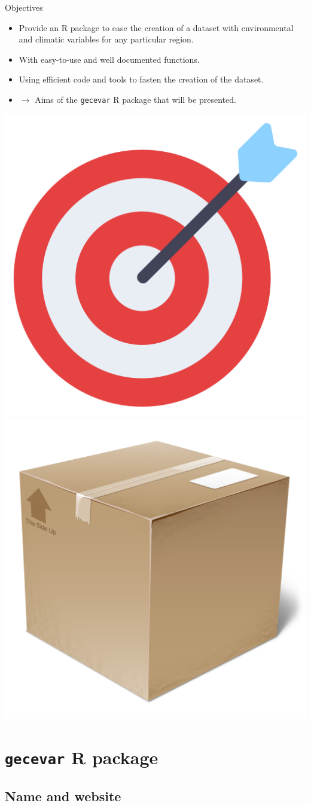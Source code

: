 \documentclass[10pt,table,dvipsnames,compress]{beamer}
\begin{document}
\begin{frame}[label={sec:org5c49b24},fragile]{Objectives}
 \begin{itemize}
\item Provide an R package to ease the creation of a dataset with environmental and climatic variables for any particular region.
\item With easy-to-use and well documented functions.
\item Using efficient code and tools to fasten the creation of the dataset.
\item \(\rightarrow\) Aims of the \texttt{gecevar} R package that will be presented.
\end{itemize}

\vspace{0.25cm}
\begin{center}
\includegraphics[height=0.2\textwidth]{figs/target.png}
\includegraphics[height=0.2\textwidth]{figs/box.png}
\end{center}
\end{frame}

\section{\texttt{gecevar} R package}
\label{sec:orga76eea0}

\subsection{Name and website}
\label{sec:org0ae5215}
\end{document}
